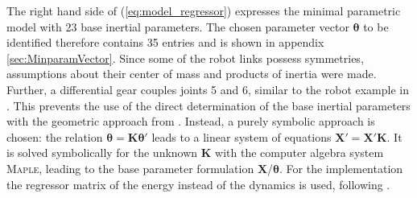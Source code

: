The right hand side of (\ref{eq:model_regressor}) expresses the minimal parametric model with 23 base inertial parameters.
The chosen parameter vector $\boldsymbol{\theta}$ to be identified therefore contains 35 entries and is shown in appendix \ref{sec:MinparamVector}.
%
Since some of the robot links possess symmetries, assumptions about their center of mass and products of inertia were made.
Further, a differential gear couples joints 5 and 6, similar to the robot example in \cite{M.Gautier.1995}.
This prevents the use of the direct determination of the base inertial parameters with the geometric approach from \cite{Khalil.2006}.
Instead, a purely symbolic approach is chosen: the relation $\boldsymbol{\theta}=\boldsymbol{K} \boldsymbol{\theta}'$ leads to a linear system of equations $\boldsymbol{X}' = \boldsymbol{X}'\boldsymbol{K}$.
It is solved symbolically for the unknown $\boldsymbol{K}$ with the computer algebra system \textsc{Maple}, leading to the base parameter formulation $\boldsymbol{X}$/$\boldsymbol{\theta}$.
For the implementation the regressor matrix of the energy instead of the dynamics is used, following \cite{M.Gautier.1995, Khalil.2006}.